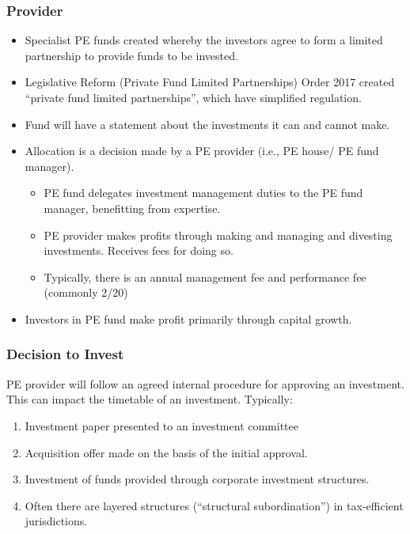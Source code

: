 \documentclass[
]{article}
\providecommand{\tightlist}{%
  \setlength{\itemsep}{0pt}\setlength{\parskip}{0pt}}
\begin{document}
\hypertarget{provider}{%
\subsubsection{Provider}\label{provider}}

\begin{itemize}
\tightlist
\item
  Specialist PE funds created whereby the investors agree to form a
  limited partnership to provide funds to be invested.
\item
  Legislative Reform (Private Fund Limited Partnerships) Order 2017
  created ``private fund limited partnerships'', which have simplified
  regulation.
\item
  Fund will have a statement about the investments it can and cannot
  make.
\item
  Allocation is a decision made by a PE provider (i.e., PE house/ PE
  fund manager).

  \begin{itemize}
  \tightlist
  \item
    PE fund delegates investment management duties to the PE fund
    manager, benefitting from expertise.
  \item
    PE provider makes profits through making and managing and divesting
    investments. Receives fees for doing so.
  \item
    Typically, there is an annual management fee and performance fee
    (commonly 2/20)
  \end{itemize}
\item
  Investors in PE fund make profit primarily through capital growth.
\end{itemize}

\hypertarget{decision-to-invest}{%
\subsubsection{Decision to Invest}\label{decision-to-invest}}

PE provider will follow an agreed internal procedure for approving an
investment. This can impact the timetable of an investment. Typically:

\begin{enumerate}
\tightlist
\item
  Investment paper presented to an investment committee
\item
  Acquisition offer made on the basis of the initial approval.
\item
  Investment of funds provided through corporate investment structures.
\item
  Often there are layered structures (``structural subordination'') in
  tax-efficient jurisdictions.
\end{enumerate}
\end{document}
